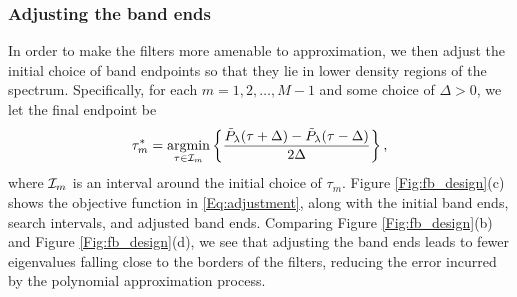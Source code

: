 \documentclass[journal, 10pt]{IEEEtran}
\begin{document}
\begin{figure}[tb]
\end{figure}

\subsubsection{Adjusting the band ends} \label{Se:adjust}

In order to make the filters more amenable to approximation, we then adjust the initial choice of band endpoints so that they lie in lower density regions of the spectrum. Specifically, for each $m=1,2,\ldots,M-1$ and some choice of $\Delta>0$, we let the final endpoint be
\begin{align} \label{Eq:adjustment}
\tau_m^* = \argmin_{\tau \in {\cal I}_m} \left\{\frac{\tilde{P}_{\lambda}(\tau+\Delta)-\tilde{P}_{\lambda}(\tau-\Delta)}{2\Delta}\right\},
\end{align}
where ${\cal I}_m$ is an interval around the initial choice of $\tau_m$. Figure \ref{Fig:fb_design}(c) shows the objective function in \eqref{Eq:adjustment}, along with the initial band ends, search intervals, and adjusted band ends. Comparing Figure \ref{Fig:fb_design}(b) and Figure \ref{Fig:fb_design}(d), we 
see that adjusting the band ends leads to fewer eigenvalues falling close to the borders of the filters, reducing the error incurred by the polynomial approximation process.
 





\end{document}
